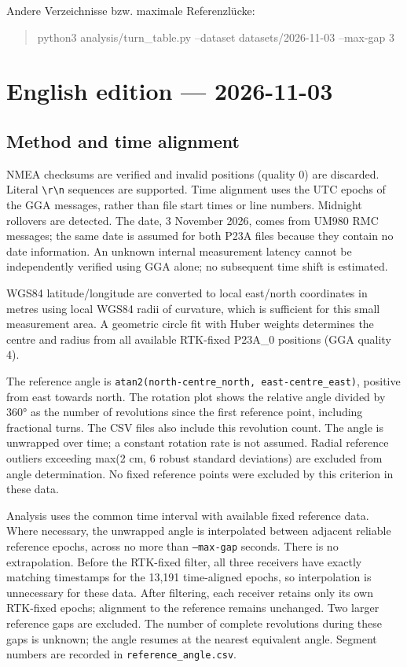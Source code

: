 \documentclass[11pt,a4paper]{article}
\numberwithin{equation}{section}
\numberwithin{figure}{section}
\begin{document}
Andere Verzeichnisse bzw. maximale Referenzlücke:

\begin{quote}\ttfamily\footnotesize python3 analysis/\allowbreak{}turn\_table.py --dataset datasets/\allowbreak{}2026-11-03 --max-gap 3\end{quote}

\clearpage\section{English edition — 2026-11-03}

\subsection{Method and time alignment}

NMEA checksums are verified and invalid positions (quality 0) are discarded. Literal {\small\texttt{\textbackslash{}r\textbackslash{}n}} sequences are supported. Time alignment uses the UTC epochs of the GGA messages, rather than file start times or line numbers. Midnight rollovers are detected. The date, 3 November 2026, comes from UM980 RMC messages; the same date is assumed for both P23A files because they contain no date information. An unknown internal measurement latency cannot be independently verified using GGA alone; no subsequent time shift is estimated.

WGS84 latitude/\allowbreak{}longitude are converted to local east/\allowbreak{}north coordinates in metres using local WGS84 radii of curvature, which is sufficient for this small measurement area. A geometric circle fit with Huber weights determines the centre and radius from all available RTK-fixed P23A\_0 positions (GGA quality 4).

The reference angle is {\small\texttt{atan2(north-centre\_\allowbreak{}north, east-centre\_\allowbreak{}east)}}, positive from east towards north. The rotation plot shows the relative angle divided by 360° as the number of revolutions since the first reference point, including fractional turns. The CSV files also include this revolution count. The angle is unwrapped over time; a constant rotation rate is not assumed. Radial reference outliers exceeding max(2 cm, 6 robust standard deviations) are excluded from angle determination. No fixed reference points were excluded by this criterion in these data.

Analysis uses the common time interval with available fixed reference data. Where necessary, the unwrapped angle is interpolated between adjacent reliable reference epochs, across no more than {\small\texttt{--max-gap}} seconds. There is no extrapolation. Before the RTK-fixed filter, all three receivers have exactly matching timestamps for the 13,191 time-aligned epochs, so interpolation is unnecessary for these data. After filtering, each receiver retains only its own RTK-fixed epochs; alignment to the reference remains unchanged. Two larger reference gaps are excluded. The number of complete revolutions during these gaps is unknown; the angle resumes at the nearest equivalent angle. Segment numbers are recorded in {\small\texttt{reference\_\allowbreak{}angle.csv}}.
\end{document}
